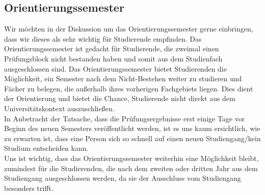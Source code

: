 \documentclass{article}
\begin{document}
\subsection{Orientierungssemester}
Wir möchten in der Diskussion um das Orientierungssemester gerne einbringen, dass wir dieses als sehr wichtig für Studierende empfinden. Das Orientierungssemester ist gedacht für Studierende, die zweimal einen Prüfungsblock nicht bestanden haben und somit aus dem Studienfach ausgeschlossen sind. Das Orientierungssemester bietet Studierenden die Möglichkeit, ein Semester nach dem Nicht-Bestehen weiter zu studieren und Fächer zu belegen, die außerhalb ihres vorherigen Fachgebiets liegen. Dies dient der Orientierung und bietet die Chance, Studierende nicht direkt aus dem Universitätskontext auszuschließen.\\

In Anbetracht der Tatsache, dass die Prüfungsergebnisse erst einige Tage vor Beginn des neuen Semesters veröffentlicht werden, ist es uns kaum ersichtlich, wie zu erwarten ist, dass eine Person sich so schnell auf einen neuen Studiengang/kein Studium entscheiden kann.\\

Uns ist wichtig, dass das Orientierungssemester weiterhin eine Möglichkeit bleibt, zumindest für die Studierenden, die nach dem zweiten oder dritten Jahr aus dem Studiengang ausgeschlossen werden, da sie der Ausschluss vom Studiengang besonders trifft.
\end{document}
